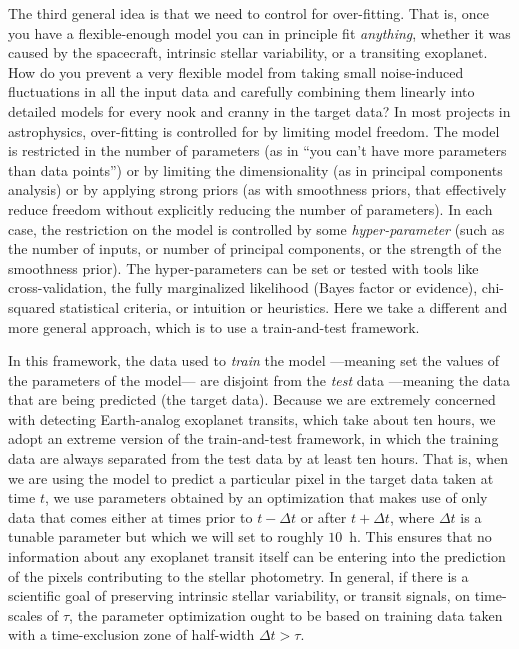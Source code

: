 \documentclass[12pt, preprint]{aastex}
\begin{document}
The third general idea is that we need to control for over-fitting.
That is, once you have a flexible-enough model you can in principle fit \emph{anything},
  whether it was caused by the spacecraft, intrinsic stellar variability, or a transiting exoplanet.
How do you prevent a very flexible model from taking small noise-induced fluctuations in all the input data
  and carefully combining them linearly into detailed models for every nook and cranny in the target data?
In most projects in astrophysics, over-fitting is controlled for by limiting model freedom.
The model is restricted in the number of parameters
  (as in ``you can't have more parameters than data points'')
  or by limiting the dimensionality
  (as in principal components analysis)
  or by applying strong priors
  (as with smoothness priors, that effectively reduce freedom without explicitly reducing the number of parameters).
In each case, the restriction on the model is controlled by some \emph{hyper-parameter}
  (such as the number of inputs, or number of principal components, or the strength of the smoothness prior).
The hyper-parameters can be set or tested with tools like cross-validation,
  the fully marginalized likelihood (Bayes factor or evidence),
  chi-squared statistical criteria,
  or intuition or heuristics.
Here we take a different and more general approach, which is to use a train-and-test framework.

In this framework, the data used to \emph{train} the model%
  ---meaning set the values of the parameters of the model---%
  are disjoint from the \emph{test} data
  ---meaning the data that are being predicted (the target data).
Because we are extremely concerned with detecting Earth-analog exoplanet transits,
  which take about ten hours,
  we adopt an extreme version of the train-and-test framework,
  in which the training data are always separated from the test data by at least ten hours.
That is, when we are using the model to predict a particular pixel in the target data taken at time $t$,
  we use parameters obtained by an optimization that makes use of only data
  that comes either at times prior to $t-\Delta t$ or after $t+\Delta t$,
  where $\Delta t$ is a tunable parameter but which we will set to roughly $10$~h.
This ensures that no information about any exoplanet transit itself
  can be entering into the prediction of the pixels contributing to the stellar photometry.
In general, if there is a scientific goal of preserving intrinsic stellar variability,
  or transit signals,
  on time-scales of $\tau$,
  the parameter optimization ought to be based on training data taken with a time-exclusion zone of half-width $\Delta t > \tau$.
\end{document}
